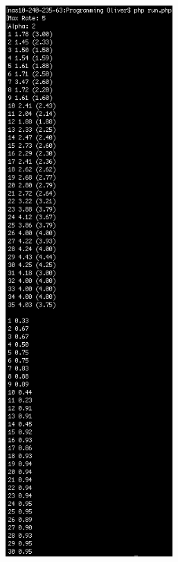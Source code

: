 \documentclass{article}
\begin{document}
\begin{figure}\ContinuedFloat
\begin{subfigure}{0.5\textwidth}
\centering
\includegraphics[width=0.70\textwidth]{Screenshots/Alpha2}

\end{subfigure}
\end{figure}
\end{document}

